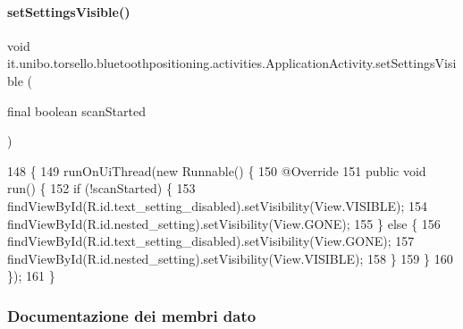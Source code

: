 \paragraph{\texorpdfstring{set\+Settings\+Visible()}{setSettingsVisible()}}
{\footnotesize\ttfamily void it.\+unibo.\+torsello.\+bluetoothpositioning.\+activities.\+Application\+Activity.\+set\+Settings\+Visible (\begin{DoxyParamCaption}\item[{final boolean}]{scan\+Started }\end{DoxyParamCaption})\hspace{0.3cm}{\ttfamily [private]}}


\begin{DoxyCode}
148                                                                \{
149         runOnUiThread(\textcolor{keyword}{new} Runnable() \{
150             @Override
151             \textcolor{keyword}{public} \textcolor{keywordtype}{void} run() \{
152                 \textcolor{keywordflow}{if} (!scanStarted) \{
153                     findViewById(R.id.text\_setting\_disabled).setVisibility(View.VISIBLE);
154                     findViewById(R.id.nested\_setting).setVisibility(View.GONE);
155                 \} \textcolor{keywordflow}{else} \{
156                     findViewById(R.id.text\_setting\_disabled).setVisibility(View.GONE);
157                     findViewById(R.id.nested\_setting).setVisibility(View.VISIBLE);
158                 \}
159             \}
160         \});
161     \}
\end{DoxyCode}


\subsubsection{Documentazione dei membri dato}
\hypertarget{classit_1_1unibo_1_1torsello_1_1bluetoothpositioning_1_1activities_1_1ApplicationActivity_a85885639575161f4d73d4fc788f44ace_a85885639575161f4d73d4fc788f44ace}{}\label{classit_1_1unibo_1_1torsello_1_1bluetoothpositioning_1_1activities_1_1ApplicationActivity_a85885639575161f4d73d4fc788f44ace_a85885639575161f4d73d4fc788f44ace} 

